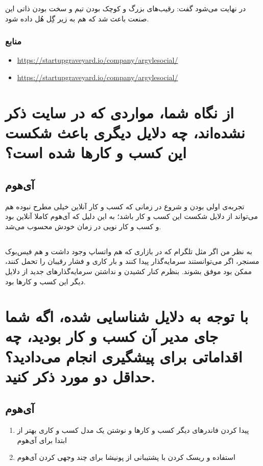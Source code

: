 \documentclass[dvipsnames, svgnames, x11names, 11pt, twocolumn]{article}
\begin{document}
در نهایت می‌شود گفت: رقیب‌های بزرگ و کوچک بودن تیم و سخت بودن ذاتی این صنعت باعث شد که 
هم به زیر گِل هُل داده شود.

\subsubsection{منابع}
\begin{itemize}
\item 
\url{https://startupgraveyard.io/company/argylesocial/}

\item 
\url{https://startupgraveyard.io/company/argylesocial/}
\end{itemize}


\section{از نگاه شما، مواردی که در سایت ذکر نشده‌اند، چه دلایل دیگری باعث شکست این کسب و کار‌ها شده است؟}
\subsection{آی‌هوم}
تجربه‌ی اولی بودن و شروع در زمانی که کسب و کار آنلاین خیلی مطرح نبوده هم می‌تواند از دلایل شکست این کسب و کار باشد؛ به این دلیل که آی‌هوم کاملا آنلاین بود و کسب و کار نویی در زمان خودش محسوب می‌شد.

\subsection{}
به نظر من اگر مثل تلگرام که در بازاری که هم واتساپ وجود داشت و هم فیس‌بوک مسنجر، اگر می‌توانستند سرمایه‌گذار پیدا کنند و بار کاری و فشار رقیبان را تحمل کنند، ممکن بود موفق بشوند. بنظرم کنار کشیدن و نداشتن سرمایه‌گذار‌های جدید از دلایل دیگر این کسب و کار‌ها بود.

\section{با توجه به دلایل شناسایی شده، اگه شما جای مدیر آن کسب و کار بودید، چه اقداماتی برای پیشگیری انجام می‌دادید؟ حداقل دو مورد ذکر کنید.}
\subsection{آی‌هوم}
\begin{enumerate}
\item 
پیدا کردن فاندر‌های دیگر کسب و کار‌ها و نوشتن یک مدل کسب و کاری بهتر از ابتدا برای آی‌هوم

\item 
استفاده و ریسک کردن با پشتیبانی از پونیشا برای چند وجهی کردن آی‌هوم

\end{enumerate}
\end{document}
